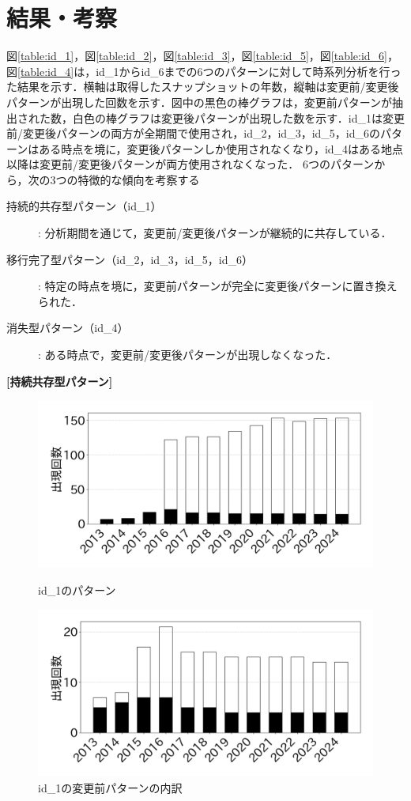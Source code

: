 \documentclass[11pt]{jreport}
\begin{document}
\section{結果・考察}
図\ref{table:id_1}，図\ref{table:id_2}，図\ref{table:id_3}，図\ref{table:id_5}，図\ref{table:id_6}，図\ref{table:id_4}は，id\_1からid\_6までの6つのパターンに対して時系列分析を行った結果を示す．横軸は取得したスナップショットの年数，縦軸は変更前/変更後パターンが出現した回数を示す．図中の黒色の棒グラフは，変更前パターンが抽出された数，白色の棒グラフは変更後パターンが出現した数を示す．id\_1は変更前/変更後パターンの両方が全期間で使用され，id\_2，id\_3，id\_5，id\_6のパターンはある時点を境に，変更後パターンしか使用されなくなり，id\_4はある地点以降は変更前/変更後パターンが両方使用されなくなった．
6つのパターンから，次の3つの特徴的な傾向を考察する
\begin{description}
    \item[持続的共存型パターン（id\_1）]: 分析期間を通じて，変更前/変更後パターンが継続的に共存している．
    \item[移行完了型パターン（id\_2，id\_3，id\_5，id\_6）]: 特定の時点を境に，変更前パターンが完全に変更後パターンに置き換えられた．
    \item[消失型パターン（id\_4）]: ある時点で，変更前/変更後パターンが出現しなくなった．
\end{description}

\noindent\textbf{[持続共存型パターン]} 
\begin{figure}[h]
    \centering
        \includegraphics[width=0.8\linewidth]{@BSthesis2024_Noguchi/Noguchi_fig/id_1.png}
        \vspace{-4mm}
        \caption{id\_1のパターン}
        \label{table:id_1}
        
    \includegraphics[width=0.8\linewidth]{@BSthesis2024_Noguchi/Noguchi_fig/test_or_not_test.png}
    \vspace{-4mm}
    \caption{id\_1の変更前パターンの内訳}
    \label{figure:test_or_not}
\end{figure}
\end{document}
